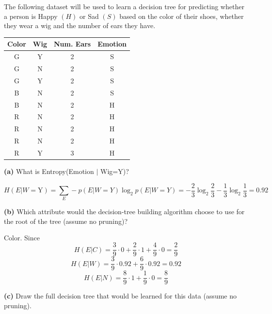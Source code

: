 \documentclass[11pt]{article}
\newcounter{marks}
\def\maxmarks#1{\extramark{#1}\addtocounter{marks}{#1}}
\def\extramark#1{
  \begin{flushright}
  [\emph{#1 points}]
  \end{flushright}
}
\renewcommand{\part}[1] {\vspace{.10in} {\bf (#1)}}
\begin{document}
The following dataset will be used to learn a decision tree for predicting whether a person is Happy $(H)$ or Sad $(S)$ based on the color of their shoes, whether they wear a wig and the number of ears they have. \\

\begin{table}[h]
	\centering
	\begin{tabular}{|c|c|c|c|}
	\hline
	Color & Wig & Num. Ears & Emotion \\
	\hline
	\hline
	G & Y & 2 & S \\
	G & N & 2 & S \\
	G & Y & 2 & S \\
	B & N & 2 & S \\
	B & N & 2 & H \\
	R & N & 2 & H \\
	R & N & 2 & H \\
	R & N & 2 & H \\
	R & Y & 3 & H \\
	\hline
	\end{tabular}
\end{table}

\part{a} What is Entropy(Emotion $\mid$ Wig=Y)? 
\maxmarks{1} {\color{blue}\[H(E|W=\text{Y})=\sum_E-p(E|W=Y)\log_2p(E|W=Y)=-\frac23\log_2\frac23-\frac13\log_2\frac13=0.92\]}

\part{b} Which attribute would the decision-tree building algorithm choose to use for the root of the tree (assume no pruning)?
\maxmarks{2} {\color{blue} Color. Since 
\[H(E|C)=\frac39\cdot0+\frac29\cdot1+\frac49\cdot0=\frac29\]
\[H(E|W)=\frac39\cdot0.92+\frac69\cdot0.92=0.92\]
\[H(E|N)=\frac89\cdot1+\frac19\cdot0=\frac89\]}

\part{c} Draw the full decision tree that would be learned for this data (assume no pruning).
\maxmarks{3}
\begin{center}
\color{blue}
\end{center}
\end{document}
